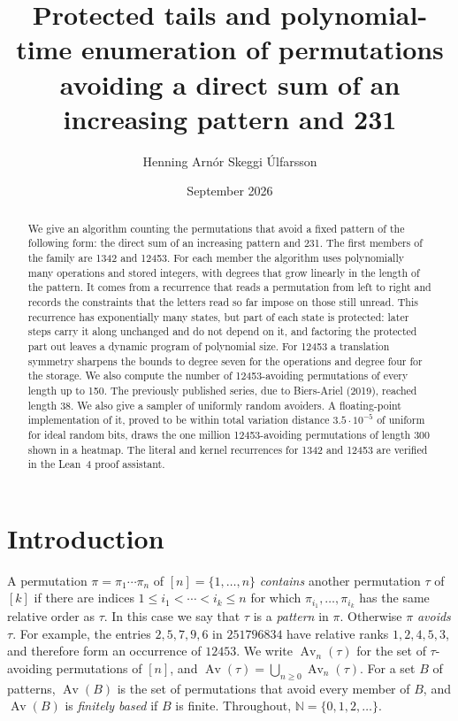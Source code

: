 \documentclass[11pt,reqno]{amsart}
\title[Protected tails and polynomial-time enumeration]
      {Protected tails and polynomial-time enumeration of permutations
       avoiding a direct sum of an increasing pattern and 231}
\author{Henning Arn\'{o}r Skeggi \'{U}lfarsson}
\date{September 2026}
\theoremstyle{definition}
\theoremstyle{remark}
\newcommand{\Av}{\operatorname{Av}}
\newcommand{\N}{\mathbb N}
\begin{document}
\raggedbottom

\begin{abstract}
We give an algorithm counting the permutations that avoid a fixed
pattern of the following form: the direct sum of an increasing pattern and
231.  The first members of the family are 1342 and 12453.  For each member
the algorithm uses polynomially many operations and stored
integers, with degrees that grow linearly in the length of the pattern.  It
comes from a recurrence that reads a permutation from left to right and
records the constraints that the letters read so far impose on those still
unread.  This recurrence has exponentially many states, but part of each
state is protected: later steps carry it along unchanged and do not depend
on it, and factoring the protected part out leaves a dynamic program of
polynomial size.  For 12453 a translation symmetry sharpens the bounds to
degree seven for the operations and degree four for the storage.  We also
compute the number of 12453-avoiding permutations of every length up to 150.
The previously published series, due to Biers-Ariel (2019), reached length
38.  We also give a sampler of uniformly random avoiders.  A
floating-point implementation of it, proved to be within total variation
distance $3.5\cdot10^{-5}$ of uniform for ideal random bits, draws the one
million
12453-avoiding permutations of length 300 shown in a heatmap.  The literal
and kernel recurrences for 1342 and 12453 are verified in the Lean~4 proof
assistant.
\end{abstract}


\maketitle

\section{Introduction}

A permutation $\pi=\pi_1\cdots\pi_n$ of
$[n]=\{1,\ldots,n\}$ \emph{contains} another permutation
$\tau$ of $[k]$ if there are indices
$1\leq i_1<\cdots<i_k\leq n$ for which
$\pi_{i_1},\ldots,\pi_{i_k}$ has the same relative order as $\tau$. In this
case we say that $\tau$ is a \emph{pattern} in $\pi$.
Otherwise $\pi$ \emph{avoids} $\tau$.  For example, the entries
$2,5,7,9,6$ in $251796834$ have relative ranks
$1,2,4,5,3$, and therefore form an occurrence of $12453$.  We write
$\Av_n(\tau)$ for the set of $\tau$-avoiding
permutations of $[n]$, and $\Av(\tau)=\bigcup_{n\geq0}\Av_n(\tau)$.  For a
set $B$ of patterns, $\Av(B)$ is the set of permutations that avoid every
member of $B$, and $\Av(B)$ is \emph{finitely based} if $B$ is finite.
Throughout, $\N=\{0,1,2,\ldots\}$.
\end{document}

